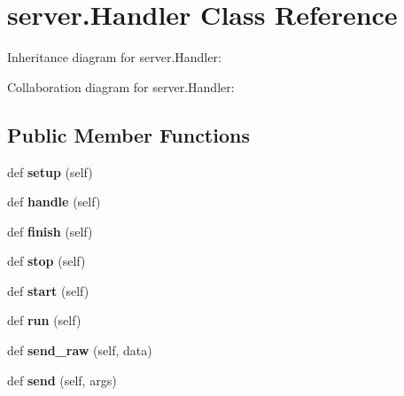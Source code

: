 \hypertarget{classserver_1_1Handler}{}\section{server.\+Handler Class Reference}
\label{classserver_1_1Handler}


Inheritance diagram for server.\+Handler\+:


Collaboration diagram for server.\+Handler\+:
\subsection*{Public Member Functions}
\begin{DoxyCompactItemize}
\item 
\mbox{\label{classserver_1_1Handler_aaa1010b08d4c9870e25c57ea41f48d27}} 
def {\bfseries setup} (self)
\item 
\mbox{\label{classserver_1_1Handler_a3b48cb51b48a14ce8bf445f87b4b2765}} 
def {\bfseries handle} (self)
\item 
\mbox{\label{classserver_1_1Handler_a972b1089c8876b45f67b26f7823eb711}} 
def {\bfseries finish} (self)
\item 
\mbox{\label{classserver_1_1Handler_aa48211356bb980e565bfb750c670f958}} 
def {\bfseries stop} (self)
\item 
\mbox{\label{classserver_1_1Handler_a9559ddb3e1f06933cb4fbbc9513fced8}} 
def {\bfseries start} (self)
\item 
\mbox{\label{classserver_1_1Handler_a038cf34aa93784b15e966ea770ccbb51}} 
def {\bfseries run} (self)
\item 
\mbox{\label{classserver_1_1Handler_af411766d0b950162a257d9af739e7351}} 
def {\bfseries send\+\_\+raw} (self, data)
\item 
\mbox{\label{classserver_1_1Handler_a0ef21f6dee735276dc69fd71e6671265}} 
def {\bfseries send} (self, args)
\end{DoxyCompactItemize}
